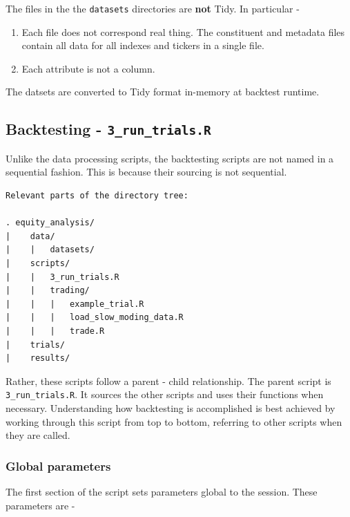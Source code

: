 \documentclass[11pt,preprint, authoryear]{elsarticle}
\numberwithin{equation}{section}
\numberwithin{figure}{section}
\numberwithin{table}{section}
\def\tightlist{} %
\begin{document}
The files in the the \texttt{datasets} directories are \textbf{not}
Tidy. In particular -

\begin{enumerate}
\def\labelenumi{\arabic{enumi}.}
\tightlist
\item
  Each file does not correspond real thing. The constituent and metadata
  files contain all data for all indexes and tickers in a single file.
\item
  Each attribute is not a column.
\end{enumerate}

The datsets are converted to Tidy format in-memory at backtest runtime.

\newpage

\subsection{\texorpdfstring{Backtesting -
\texttt{3\_run\_trials.R}}{Backtesting - 3\_run\_trials.R}}\label{backtesting---3_run_trials.r}

Unlike the data processing scripts, the backtesting scripts are not
named in a sequential fashion. This is because their sourcing is not
sequential.

\begin{verbatim}
Relevant parts of the directory tree: 

. equity_analysis/
|    data/
|    |   datasets/
|    scripts/
|    |   3_run_trials.R
|    |   trading/
|    |   |   example_trial.R
|    |   |   load_slow_moding_data.R
|    |   |   trade.R
|    trials/
|    results/
\end{verbatim}

Rather, these scripts follow a parent - child relationship. The parent
script is \texttt{3\_run\_trials.R}. It sources the other scripts and
uses their functions when necessary. Understanding how backtesting is
accomplished is best achieved by working through this script from top to
bottom, referring to other scripts when they are called.

\subsubsection{Global parameters}\label{global-parameters}

The first section of the script sets parameters global to the session.
These parameters are -
\end{document}
